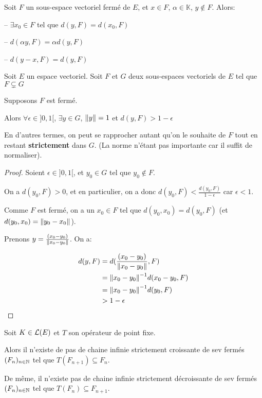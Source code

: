 	

\begin{exercice}
	Soit $F$ un sous-espace vectoriel fermé de $E$, et $x \in F$, $\alpha \in
	\mathbb{K}$, $y \notin F$. Alors:

	-- $\exists x_{0} \in F$ tel que $d(y, F) = d(x_{0}, F)$

	-- $d(\alpha y, F) = \alpha d(y, F)$
	
	-- $d(y - x, F) = d(y, F)$
\end{exercice}

\begin{proposition}
	Soit $E$ un espace vectoriel. Soit $F$ et $G$ deux sous-espaces vectoriels
	de $E$ tel que $F \subsetneq G$

	Supposons $F$ est fermé.

	Alors $\forall \epsilon \in ]0, 1[$, $\exists y \in G$, $\norm{y} = 1$ et
	$d(y, F) > 1 - \epsilon$

	En d'autres termes, on peut se rapprocher autant qu'on le souhaite de $F$
	tout en restant \textbf{strictement} dans $G$. (La norme n'étant pas
	importante car il suffit de normaliser).
\end{proposition}

\begin{proof}
	Soient $\epsilon \in ]0, 1[$, et $y_{0} \in G$ tel que $y_{0} \notin F$.
	
	On a $d(y_{0}, F) > 0$, et en particulier, on a donc $d(y_{0}, F) < 
	\frac{d(y_{0},F)}{1 - \epsilon}$ car $\epsilon < 1$.

	Comme $F$ est fermé, on a un $x_{0} \in F$ tel que $d(y_{0}, x_{0}) =
	d(y_{0}, F)$ (et $d(y_{0}, x_{0}) = \norm{y_{0} - x_{0}}$).

	Prenons $y = \frac{(x_{0} - y_{0})}{\norm{x_{0} - y_{0}}}$. On a:

	\begin{align}
		d(y, F) &= d(\frac{(x_{0} - y_{0})}{\norm{x_{0} - y_{0}}}, F) \\
		&= \norm{x_{0} - y_{0}}^{-1} d(x_{0} - y_{0}, F) \\
		&= \norm{x_{0} - y_{0}}^{-1} d(y_{0}, F) \\
		&> 1 - \epsilon
	\end{align}
\end{proof}

\begin{proposition}
	Soit $K \in \mathcal{L}(E)$ et $T$ son opérateur de point fixe.
	
	Alors il n'existe de pas de chaine infinie strictement croissante de sev
	fermés $(F_{n})_{n \in \mathbb{N}}$ tel que $T(F_{n + 1}) \subseteq
	F_{n}$.

	De même, il n'existe pas de chaine infinie strictement décroissante de
	sev fermés $(F_{n})_{n \in \mathbb{N}}$ tel que $T(F_{n}) \subseteq F_{n +
	1}$.
\end{proposition}

